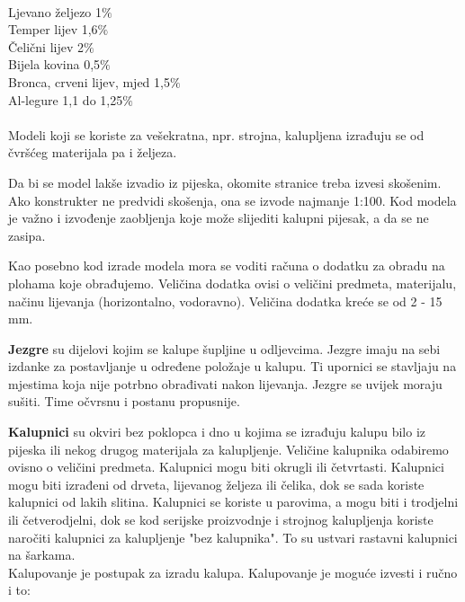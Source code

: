 \documentclass[a4paper,12pt]{article}
\numberwithin{figure}{section}
\begin{document}
\\
Ljevano željezo 1$\%$\\
Temper lijev 1,6$\%$\\
Čelični lijev 2$\%$\\
Bijela kovina 0,5$\%$\\
Bronca, crveni lijev, mjed 1,5$\%$\\
Al-legure 1,1 do 1,25$\%$\\
\\
Modeli koji se koriste za vešekratna, npr. strojna, kalupljena izrađuju se od čvršćeg materijala pa i željeza. \par
Da bi se model lakše izvadio iz pijeska, okomite stranice treba izvesi skošenim. Ako konstrukter ne predvidi skošenja, ona se izvode najmanje 1:100. Kod modela je važno i izvođenje zaobljenja koje može slijediti kalupni pijesak, a da se ne zasipa.\par
Kao posebno kod izrade modela mora se voditi računa o dodatku za obradu na plohama koje obrađujemo. Veličina dodatka ovisi o veličini predmeta, materijalu, načinu lijevanja (horizontalno, vodoravno). Veličina dodatka kreće se od 2 - 15 mm.\par
\textbf{Jezgre} su dijelovi kojim se kalupe šupljine u odljevcima. Jezgre imaju na sebi izdanke za postavljanje u određene položaje u kalupu. Ti upornici se stavljaju na mjestima koja nije potrbno obrađivati nakon lijevanja. Jezgre se uvijek moraju sušiti. Time očvrsnu i postanu propusnije.\par
\textbf{Kalupnici} su okviri bez poklopca i dno u kojima se izrađuju kalupu bilo iz pijeska ili nekog drugog materijala za kalupljenje. Veličine kalupnika odabiremo ovisno o veličini predmeta. Kalupnici mogu biti okrugli ili četvrtasti. Kalupnici mogu biti izrađeni od drveta, lijevanog željeza ili čelika, dok se sada koriste kalupnici od lakih slitina. Kalupnici se koriste u parovima, a mogu biti i trodjelni ili četverodjelni, dok se kod serijske proizvodnje i strojnog kalupljenja koriste naročiti kalupnici za kalupljenje "bez kalupnika". To su ustvari rastavni kalupnici na šarkama.\\
Kalupovanje je postupak za izradu kalupa. Kalupovanje je moguće izvesti i ručno i to:
\end{document}
